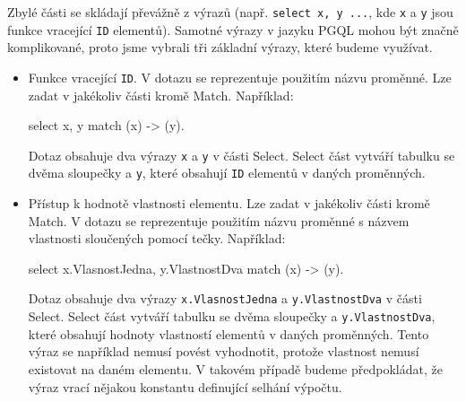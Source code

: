 Zbylé části se skládají převážně z výrazů (např. \texttt{select x, y ...}, kde \texttt{x} a \texttt{y} jsou funkce vracející \texttt{ID} elementů).
Samotné výrazy v jazyku PGQL mohou být značně komplikované, proto jsme vybrali tři základní výrazy, které budeme využívat.
\begin{itemize}

\item Funkce vracející \texttt{ID}. 
V dotazu se reprezentuje použitím názvu proměnné.
Lze zadat v jakékoliv části kromě Match.
Například:
\begin{code}
select x, y match (x) -> (y).
\end{code}
Dotaz obsahuje dva výrazy \texttt{x} a \texttt{y} v části Select.
Select část vytváří tabulku se dvěma sloupečky  a \texttt{y}, které obsahují \texttt{ID} elementů v daných proměnných.

\item 
Přístup k hodnotě vlastnosti elementu.
Lze zadat v jakékoliv části kromě Match.
V dotazu se reprezentuje použitím názvu proměnné s názvem vlastnosti sloučených pomocí tečky.
Například: 
\begin{code}
select x.VlasnostJedna, y.VlastnostDva match (x) -> (y).
\end{code}
Dotaz obsahuje dva výrazy \texttt{x.VlasnostJedna} a \texttt{y.VlastnostDva} v části Select.
Select část vytváří tabulku se dvěma sloupečky  a \texttt{y.VlastnostDva}, které obsahují hodnoty vlastností elementů v daných proměnných.
Tento výraz se například nemusí povést vyhodnotit, protože vlastnost nemusí existovat na daném elementu.
V takovém případě budeme předpokládat, že výraz vrací nějakou konstantu definující selhání výpočtu.


\end{itemize}
